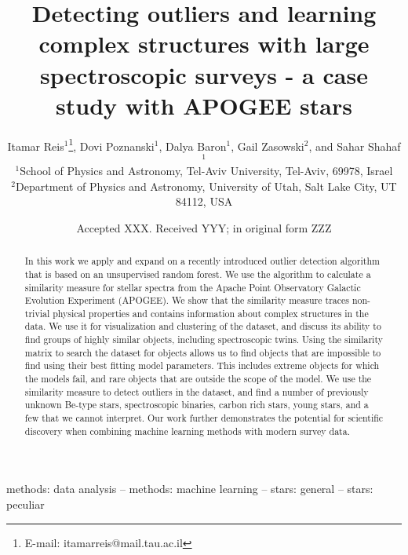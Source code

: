 \documentclass[fleqn,usenatbib]{mnras}
\title[Outliers and similarity in APOGEE]{Detecting outliers and learning complex structures with large spectroscopic surveys - a case study with APOGEE stars}
\author[I. Reis et al.]{
Itamar Reis$^{1}$\thanks{E-mail: itamarreis@mail.tau.ac.il},
Dovi Poznanski$^{1}$,
Dalya Baron$^{1}$,
Gail Zasowski$^{2}$,
and Sahar Shahaf$^{1}$
\\
$^{1}$School of Physics and Astronomy, Tel-Aviv University, Tel-Aviv, 69978, Israel\\
$^{2}$Department of Physics and Astronomy, University of Utah, Salt Lake City, UT 84112, USA\\
}
\date{Accepted XXX. Received YYY; in original form ZZZ}
\begin{document}
\label{firstpage}
\pagerange{\pageref{firstpage}--\pageref{lastpage}}
\maketitle

\begin{abstract}
In this work we apply and expand on a recently introduced outlier detection algorithm that is based on an unsupervised random forest. We use the algorithm to calculate a similarity measure for stellar spectra from the Apache Point Observatory Galactic Evolution Experiment (APOGEE). We show that the similarity measure traces non-trivial physical properties and contains information about complex structures in the data. We use it for visualization and clustering of the dataset, and discuss its ability to find groups of highly similar objects, including spectroscopic twins. Using the similarity matrix to search the dataset for objects allows us to find objects that are impossible to find using their best fitting model parameters. This includes extreme objects for which the models fail, and rare objects that are outside the scope of the model. We use the similarity measure to detect outliers in the dataset, and find a number of previously unknown Be-type stars, spectroscopic binaries, carbon rich stars, young stars, and a few that we cannot interpret. Our work further demonstrates the potential for scientific discovery when combining machine learning methods with modern survey data.
\end{abstract}

\begin{keywords}
methods: data analysis -- methods: machine learning -- stars: general -- stars: peculiar
\end{keywords}




\end{document}
